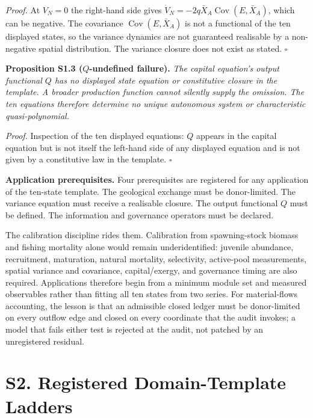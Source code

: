 \documentclass[11pt]{article}
\begin{document}
\emph{Proof.} At \(V_N = 0\) the right-hand side gives \(\dot V_N = -2q\bar X_A \operatorname{Cov}(E, \bar X_A)\), which can be negative. The covariance \(\operatorname{Cov}(E, \bar X_A)\) is not a functional of the ten displayed states, so the variance dynamics are not guaranteed realisable by a non-negative spatial distribution. The variance closure does not exist as stated. \(\square\)

\textbf{Proposition S1.3 (\(Q\)-undefined failure).} \emph{The capital equation's output functional \(Q\) has no displayed state equation or constitutive closure in the template. A broader production function cannot silently supply the omission. The ten equations therefore determine no unique autonomous system or characteristic quasi-polynomial.}

\emph{Proof.} Inspection of the ten displayed equations: \(Q\) appears in the capital equation but is not itself the left-hand side of any displayed equation and is not given by a constitutive law in the template. \(\square\)

\textbf{Application prerequisites.} Four prerequisites are registered for any application of the ten-state template. The geological exchange must be donor-limited. The variance equation must receive a realisable closure. The output functional \(Q\) must be defined. The information and governance operators must be declared.

The calibration discipline rides them. Calibration from spawning-stock biomass and fishing mortality alone would remain underidentified: juvenile abundance, recruitment, maturation, natural mortality, selectivity, active-pool measurements, spatial variance and covariance, capital/exergy, and governance timing are also required. Applications therefore begin from a minimum module set and measured observables rather than fitting all ten states from two series. For material-flows accounting, the lesson is that an admissible closed ledger must be donor-limited on every outflow edge and closed on every coordinate that the audit invokes; a model that fails either test is rejected at the audit, not patched by an unregistered residual.

\vspace{0.8em}

\section*{S2. Registered Domain-Template Ladders}\label{s2-registered-domain-template-ladders}
\end{document}
